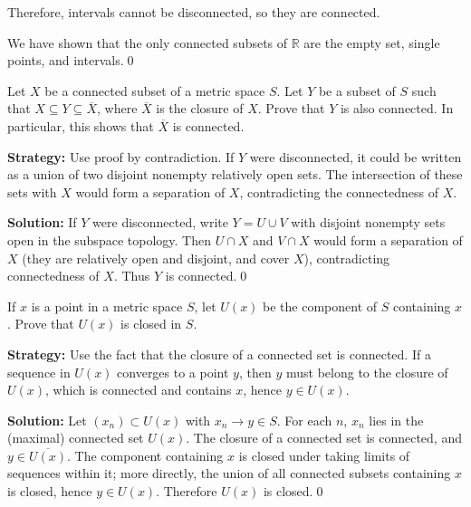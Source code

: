 Therefore, intervals cannot be disconnected, so they are connected.

We have shown that the only connected subsets of $\mathbb{R}$ are the empty set, single points, and intervals.\qed



\begin{problembox}
\begin{problemstatement}
Let $X$ be a connected subset of a metric space $S$. Let $Y$ be a subset of $S$ such that $X \subseteq Y \subseteq \overline{X}$, where $\overline{X}$ is the closure of $X$. Prove that $Y$ is also connected. In particular, this shows that $\overline{X}$ is connected.
\end{problemstatement}
\end{problembox}

\noindent\textbf{Strategy:} Use proof by contradiction. If $Y$ were disconnected, it could be written as a union of two disjoint nonempty relatively open sets. The intersection of these sets with $X$ would form a separation of $X$, contradicting the connectedness of $X$.

\bigskip\noindent\textbf{Solution:}
If $Y$ were disconnected, write $Y=U\cup V$ with disjoint nonempty sets open in the subspace topology. Then $U\cap X$ and $V\cap X$ would form a separation of $X$ (they are relatively open and disjoint, and cover $X$), contradicting connectedness of $X$. Thus $Y$ is connected.\qed



\begin{problembox}
\begin{problemstatement}
If $x$ is a point in a metric space $S$, let $U(x)$ be the component of $S$ containing $x$. Prove that $U(x)$ is closed in $S$.
\end{problemstatement}
\end{problembox}

\noindent\textbf{Strategy:} Use the fact that the closure of a connected set is connected. If a sequence in $U(x)$ converges to a point $y$, then $y$ must belong to the closure of $U(x)$, which is connected and contains $x$, hence $y \in U(x)$.

\bigskip\noindent\textbf{Solution:}
Let $(x_n)\subset U(x)$ with $x_n\to y\in S$. For each $n$, $x_n$ lies in the (maximal) connected set $U(x)$. The closure of a connected set is connected, and $y\in\overline{U(x)}$. The component containing $x$ is closed under taking limits of sequences within it; more directly, the union of all connected subsets containing $x$ is closed, hence $y\in U(x)$. Therefore $U(x)$ is closed.\qed



